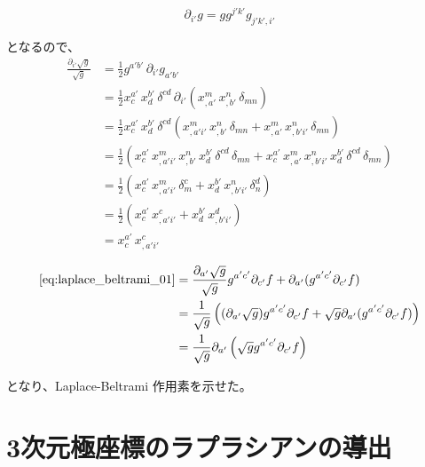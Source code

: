 \documentclass[a4paper,11pt]{article}
\begin{document}
\begin{equation}
  \partial_{i'}g = gg^{j'k'}g_{j'k',i'}
\end{equation}

\noindent
となるので、
\begin{align}
  \frac{\partial_{i'}\sqrt{g}}{\sqrt{g}}
   & = \frac12 g^{a'b'}\,\partial_{i'} g_{a'b'}                     \nonumber \\
   & = \frac12 x^{a'}_{c}\,x^{b'}_{d}\,\delta^{cd}\,
  \partial_{i'}\left( x^{m}_{,a'}\,x^{n}_{,b'}\,\delta_{mn} \right) \nonumber \\
   & = \frac12 x^{a'}_{c}\,x^{b'}_{d}\,\delta^{cd} \left(
  x^{m}_{,a'i'}\,x^{n}_{,b'}\,\delta_{mn}
  + x^{m}_{,a'}\,x^{n}_{,b'i'}\,\delta_{mn}
  \right)                                                           \nonumber \\
   & = \frac12\left(
  x^{a'}_{c}\,x^{m}_{,a'i'}\,x^{n}_{,b'}\,x^{b'}_{d}\,
  \delta^{cd}\,\delta_{mn}
  +
  x^{a'}_{c}\,x^{m}_{,a'}\,x^{n}_{,b'i'}\,x^{b'}_{d}\,
  \delta^{cd}\,\delta_{mn}
  \right)                                                           \nonumber \\
   & = \frac12\left(
  x^{a'}_{c}\,x^{m}_{,a'i'}\,\delta^{c}_{m}
  +
  x^{b'}_{d}\,x^{n}_{,b'i'}\,\delta^{d}_{n}
  \right)                                                           \nonumber \\
   & = \frac12\left(
  x^{a'}_{c}\,x^{c}_{,a'i'}
  +
  x^{b'}_{d}\,x^{d}_{,b'i'}
  \right)                                                           \nonumber \\
   & = x^{a'}_{c}\,x^{c}_{,a'i'}
\end{align}

\begin{align}
  \eqref{eq:laplace_beltrami_01} & = \frac{\partial_{a'}\sqrt{g}}{\sqrt{g}}g^{a'c'}\partial_{c'}f + \partial_{a'}(g^{a'c'}\partial_{c'}f) \nonumber                            \\
                                 & = \frac{1}{\sqrt{g}} \left( (\partial_{a'}\sqrt{g})g^{a'c'}\partial_{c'}f + \sqrt{g}\partial_{a'}(g^{a'c'}\partial_{c'}f) \right) \nonumber \\
                                 & = \frac{1}{\sqrt{g}} \partial_{a'} \left(\sqrt{g}g^{a'c'}\partial_{c'}f\right)
\end{align}

\noindent
となり、Laplace-Beltrami 作用素を示せた。

\section{3次元極座標のラプラシアンの導出}
\end{document}
